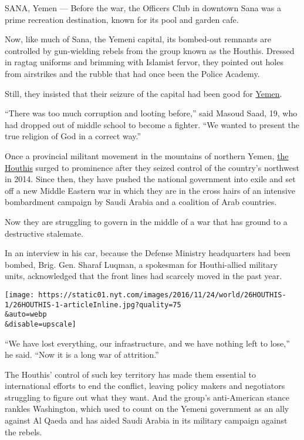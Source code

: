 SANA, Yemen --- Before the war, the Officers Club in downtown Sana was a
prime recreation destination, known for its pool and garden cafe.

Now, like much of Sana, the Yemeni capital, its bombed-out remnants are
controlled by gun-wielding rebels from the group known as the Houthis.
Dressed in ragtag uniforms and brimming with Islamist fervor, they
pointed out holes from airstrikes and the rubble that had once been the
Police Academy.

Still, they insisted that their seizure of the capital had been good for
\href{http://www.nytimes.com/topic/destination/yemen}{Yemen}.

``There was too much corruption and looting before,'' said Masoud Saad,
19, who had dropped out of middle school to become a fighter. ``We
wanted to present the true religion of God in a correct way.''

Once a provincial militant movement in the mountains of northern Yemen,
\href{http://www.nytimes.com/2015/01/21/world/middleeast/who-are-the-houthis-of-yemen.html}{the
Houthis} surged to prominence after they seized control of the country's
northwest in 2014. Since then, they have pushed the national government
into exile and set off a new Middle Eastern war in which they are in the
cross hairs of an intensive bombardment campaign by Saudi Arabia and a
coalition of Arab countries.

Now they are struggling to govern in the middle of a war that has ground
to a destructive stalemate.

In an interview in his car, because the Defense Ministry headquarters
had been bombed, Brig. Gen. Sharaf Luqman, a spokesman for Houthi-allied
military units, acknowledged that the front lines had scarcely moved in
the past year.

\texttt{[image: https://static01.nyt.com/images/2016/11/24/world/26HOUTHIS-1/26HOUTHIS-1-articleInline.jpg?quality=75\\\&auto=webp\\\&disable=upscale]}

``We have lost everything, our infrastructure, and we have nothing left
to lose,'' he said. ``Now it is a long war of attrition.''

The Houthis' control of such key territory has made them essential to
international efforts to end the conflict, leaving policy makers and
negotiators struggling to figure out what they want. And the group's
anti-American stance rankles Washington, which used to count on the
Yemeni government as an ally against Al Qaeda and has aided Saudi Arabia
in its military campaign against the rebels.

